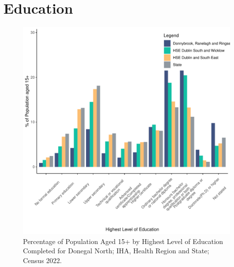 \documentclass{article}
\begin{document}
\section{Education}\label{sect:Edu}
\begin{figure}[H]
	\centering
	\includegraphics[width = 120mm]{../figures/EduED.pdf}
	\caption{Percentage of Population Aged 15+ by Highest Level of Education Completed for Donegal North; IHA, Health Region and State; Census 2022.}
	\label{fig:vbnv}
	\end{figure}
\end{document}
